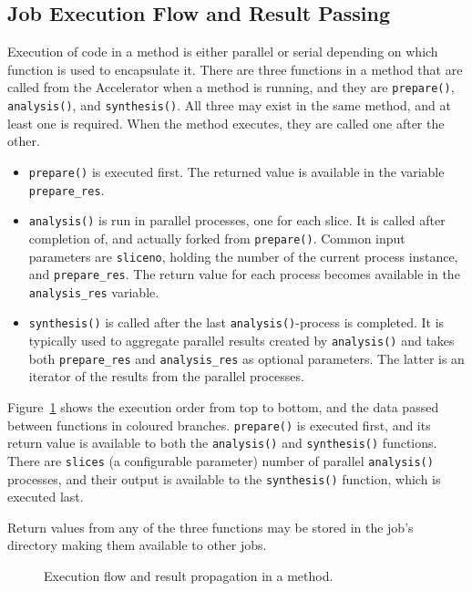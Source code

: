 \subsection{Job Execution Flow and Result Passing}

Execution of code in a method is either parallel or serial depending
on which function is used to encapsulate it.  There are three
functions in a method that are called from the Accelerator when a
method is running, and they are \texttt{prepare()},
\texttt{analysis()}, and \texttt{synthesis()}.  All three may exist in
the same method, and at least one is required.  When the method
executes, they are called one after the other.
\begin{itemize}
\item[] \texttt{prepare()} is executed first.  The returned value is
  available in the variable \texttt{prepare\_res}.
\item[] \texttt{analysis()} is run in parallel processes, one for each
  slice.  It is called after completion of, and actually forked from
  \texttt{prepare()}.  Common input parameters are \texttt{sliceno},
  holding the number of the current process instance, and
  \texttt{prepare\_res}.  The return value for each process becomes
  available in the \texttt{analysis\_res} variable.
\item[] \texttt{synthesis()} is called after the last
  \texttt{analysis()}-process is completed.  It is typically used to
  aggregate parallel results created by \texttt{analysis()} and takes
  both \texttt{prepare\_res} and \texttt{analysis\_res} as optional
  parameters.  The latter is an iterator of the results from the
  parallel processes.
\end{itemize}
Figure~\ref{fig:prepanasyn} shows the execution order from top to
bottom, and the data passed between functions in coloured branches.
\texttt{prepare()} is executed first, and its return value is
available to both the \texttt{analysis()} and \texttt{synthesis()}
functions.  There are \texttt{slices} (a configurable parameter)
number of parallel \texttt{analysis()} processes, and their output is
available to the \texttt{synthesis()} function, which is executed
last.

Return values from any of the three functions may be stored in the
job's directory making them available to other jobs.


\begin{figure}[t]
  \begin{center}
    
    \caption{Execution flow and result propagation in a method.}
    \label{fig:prepanasyn}
  \end{center}
\end{figure}


